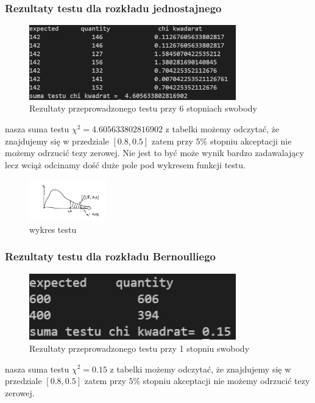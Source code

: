\documentclass[9pt]{beamer}
\begin{document}
\begin{frame}
  \frametitle{Rezultaty testu dla rozkładu jednostajnego}
  \begin{figure}[h!]
    \centering
    \includegraphics[width=0.8\textwidth]{assets/jednostajnychi.PNG}
      \caption{Rezultaty przeprowadzonego testu przy 6 stopniach swobody}
  \end{figure}
  nasza suma testu $\chi^2 = 4.605633802816902$ z tabelki możemy odczytać, że znajdujemy się w przedziale $[0.8, 0.5]$ zatem przy $5\%$ stopniu akceptacji nie możemy odrzucić tezy zerowej. Nie jest to być może wynik bardzo zadawalający lecz wciąż odcinamy dość duże pole pod wykresem funkcji testu.
  \begin{figure}[h!]
    \centering
    \includegraphics[width=0.3\textwidth]{assets/chart.png}
      \caption{wykres testu}
  \end{figure}
\end{frame}
\begin{frame}
  \frametitle{Rezultaty testu dla rozkładu Bernoulliego}
  \begin{figure}[h!]
    \centering
    \includegraphics[width=0.8\textwidth]{assets/binom.PNG}
      \caption{Rezultaty przeprowadzonego testu przy 1 stopniu swobody}
  \end{figure}
  nasza suma testu $\chi^2 = 0.15$ z tabelki możemy odczytać, że znajdujemy się w przedziale $[0.8, 0.5]$ zatem przy $5\%$ stopniu akceptacji nie możemy odrzucić tezy zerowej.
\end{frame}
\end{document}
